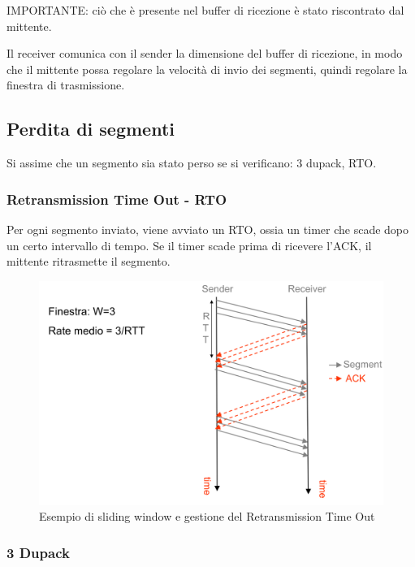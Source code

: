 IMPORTANTE: ciò che è presente nel buffer di ricezione è stato riscontrato dal mittente.

Il receiver comunica con il sender la dimensione del buffer di ricezione, in modo che il mittente possa regolare la velocità di invio dei segmenti, quindi regolare la finestra di trasmissione.



\subsection{Perdita di segmenti} 
Si assime che un segmento sia stato perso se si verificano: 3 dupack, RTO.

 \subsubsection{Retransmission Time Out - RTO}
Per ogni segmento inviato, viene avviato un RTO, ossia un timer che scade dopo un certo intervallo di tempo. Se il timer scade prima di ricevere l'ACK, il mittente ritrasmette il segmento.

\begin{figure}[h!]
    \centering
    \includegraphics[width=1.2\textwidth]{images/slidingwindowesempio.png}
    \caption{Esempio di sliding window e gestione del Retransmission Time Out}
    \label{fig:slidingwindowrto}
\end{figure}


\subsubsection{3 Dupack}

